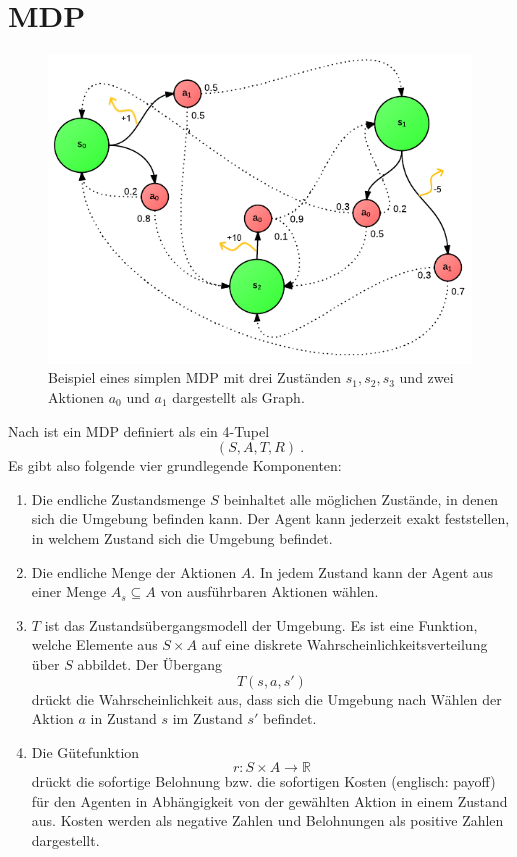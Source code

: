 \documentclass[a4paper]{IEEEtran}
\begin{document}
\section{MDP}
\begin{figure}[ht]
	\centering
	\includegraphics[scale=0.42]{images/MDP_example.png}
	\caption{Beispiel eines simplen MDP mit drei Zuständen $s_1, s_2, s_3$ und zwei Aktionen $a_0$ und $a_1$ dargestellt als Graph.}
	\label{fig:MDP_example} %
\end{figure}
Nach \cite{cassandra1995acting} ist ein MDP definiert als ein 4-Tupel
\begin{equation}
	(S, A, T, R) \ .
\end{equation}
Es gibt also folgende vier grundlegende Komponenten:
\begin{enumerate}
	\item Die endliche Zustandsmenge $S$ beinhaltet alle möglichen Zustände, in denen sich die Umgebung befinden kann. Der Agent kann jederzeit exakt feststellen, in welchem Zustand sich die Umgebung befindet.
	\item Die endliche Menge der Aktionen $A$. In jedem Zustand kann der Agent aus einer Menge $A_s \subseteq A$ von ausführbaren Aktionen wählen.
	\item $T$ ist das Zustandsübergangsmodell der Umgebung. Es ist eine Funktion, welche Elemente aus $S \times A$ auf eine diskrete Wahrscheinlichkeitsverteilung über $S$ abbildet. Der Übergang
	\begin{equation}
		T(s, a, s')
	\end{equation}
	drückt die Wahrscheinlichkeit aus, dass sich die Umgebung nach Wählen der Aktion $a$ in Zustand $s$ im Zustand $s'$ befindet.
	\item Die Gütefunktion
	\begin{equation}
		r: S \times A \rightarrow \mathbb{R}
		\label{eq:guetefkt}
	\end{equation}
	drückt die sofortige Belohnung bzw. die sofortigen Kosten (englisch: payoff) für den Agenten in Abhängigkeit von der gewählten Aktion in einem Zustand aus. Kosten werden als negative Zahlen und Belohnungen als positive Zahlen dargestellt.
\end{enumerate}
\end{document}
